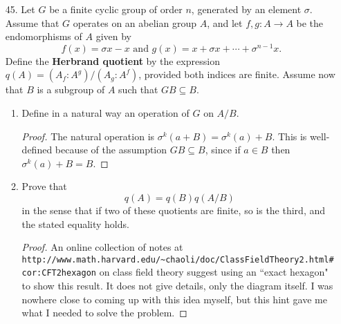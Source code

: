 \documentclass[10pt]{article}
\renewcommand{\bar}{\overline}
\begin{document}
\begin{enumerate}
\begin{proof}
The image of $\iota$ is $\{a+B \mid a \in A_f\}$.  The sequence is exact because the kernel of $\bar{f}$ is
\begin{align*}
\ker(\bar{f}) &= \{a+B \mid f(a) \in B^f \} \\
&= \{a+B \mid f(a) = f(b) \text{ for some } b \in B \} \\
&= \{a+B \mid a - b \in A_f \text{ for some } b \in B \} \\
&= \{a + b + B \mid a \in A_f, b \in B \} \\
&= \{a + B \mid a \in A_f \}
\end{align*}
as well.  Therefore, we have an isomorphism $(A/B) / \iota(A_f / B_f) \cong A^f / B^f$ (this occurs with any short exact sequence of abelian groups:  if $0 \rightarrow K \xrightarrow{\varphi} G \xrightarrow{\psi} H \rightarrow 0$ is exact, then $x + \varphi(K) \mapsto \psi(x)$ is an isomorphism of $G / \varphi(K)$ to $H$).

Since $|A_f / B_f| = |\iota(A_f / B_f)|$, it is clear now that if any two of the mentioned indices are finite, then so must be the third, and they must satisfy the asserted equality.
\end{proof}

\item[45.] Let $G$ be a finite cyclic group of order $n$, generated by an element $\sigma$.  Assume that $G$ operates on an abelian group $A$, and let $f,g:A \rightarrow A$ be the endomorphisms of $A$ given by
$$
f(x) = \sigma x - x \text{ and } g(x) = x + \sigma x + \cdots + \sigma^{n-1} x.
$$
Define the \textbf{Herbrand quotient} by the expression $q(A) = (A_f:A^g) / (A_g : A^f)$, provided both indices are finite.  Assume now that $B$ is a subgroup of $A$ such that $GB \subseteq B$.
\begin{enumerate}
\item Define in a natural way an operation of $G$ on $A / B$.
\begin{proof}
The natural operation is $\sigma^k(a+B) = \sigma^k(a)+B$.  This is well-defined because of the assumption $GB \subseteq B$, since if $a \in B$ then $\sigma^k(a)+B = B$.
\end{proof}
\item Prove that
$$
q(A) = q(B)q(A/B)
$$
in the sense that if two of these quotients are finite, so is the third, and the stated equality holds.
\begin{proof}
An online collection of notes at \\ \verb|http://www.math.harvard.edu/~chaoli/doc/ClassFieldTheory2.html#cor:CFT2hexagon| on class field theory suggest using an ``exact hexagon" to show this result.  It does not give details, only the diagram itself.  I was nowhere close to coming up with this idea myself, but this hint gave me what I needed to solve the problem.


\end{proof}
\end{enumerate}
\end{enumerate}
\end{document}
